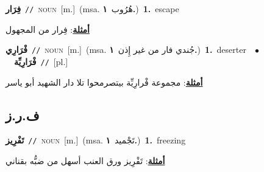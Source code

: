 \documentclass[10pt,a4paper,twoside]{article} %
\begin{document}
\begin{multicols}{2}
{\setlength\topsep{0pt}\textbf{\foreignlanguage{arabic}{فِرَار}}\ {\color{gray}\texttt{//}\color{black}}\ \textsc{noun}\ [m.]\ \color{gray}(msa. \foreignlanguage{arabic}{هُرُوب}~\foreignlanguage{arabic}{\textbf{١.}})\color{black}\ \textbf{1.}~escape\  \begin{flushright}\color{gray}\foreignlanguage{arabic}{\textbf{\underline{\foreignlanguage{arabic}{أمثلة}}}: فِرار من المجهول}\end{flushright}\color{black}} \vspace{2mm}

{\setlength\topsep{0pt}\textbf{\foreignlanguage{arabic}{فْرَارِي}}\ {\color{gray}\texttt{//}\color{black}}\ \textsc{noun}\ [m.]\ \color{gray}(msa. \foreignlanguage{arabic}{جُندي فار من غير إِذن}~\foreignlanguage{arabic}{\textbf{١.}})\color{black}\ \textbf{1.}~deserter\ \ $\bullet$\ \ \setlength\topsep{0pt}\textbf{\foreignlanguage{arabic}{فْرَارِيِّة}}\ {\color{gray}\texttt{//}\color{black}}\ [pl.]\  \begin{flushright}\color{gray}\foreignlanguage{arabic}{\textbf{\underline{\foreignlanguage{arabic}{أمثلة}}}: مجموعة فْرارِيِّة بيتصرمحوا تلا دار الشهيد أبو ياسر}\end{flushright}\color{black}} \vspace{2mm}

\vspace{-3mm}
\subsection*{\color{blue}\foreignlanguage{arabic}{ف.ر.ز}\color{blue}{}} 

{\setlength\topsep{0pt}\textbf{\foreignlanguage{arabic}{تَفْرِيز}}\ {\color{gray}\texttt{//}\color{black}}\ \textsc{noun}\ [m.]\ \color{gray}(msa. \foreignlanguage{arabic}{تَجْميد}~\foreignlanguage{arabic}{\textbf{١.}})\color{black}\ \textbf{1.}~freezing\  \begin{flushright}\color{gray}\foreignlanguage{arabic}{\textbf{\underline{\foreignlanguage{arabic}{أمثلة}}}: تَفْرِيز ورق العنب أسهل من ضبُّه بقناني}\end{flushright}\color{black}} \vspace{2mm}


\end{multicols}
\end{document}
